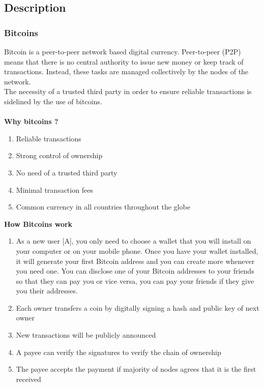 \documentclass[a4page,12pt]{article}
\begin{document}
\subsection{Description}
\subsubsection{Bitcoins}
Bitcoin is a peer-to-peer network based digital currency. Peer-to-peer (P2P) means that there is no central authority to issue new money or keep track of transactions. Instead, these tasks are managed collectively by the nodes of the network.\\The necessity of a trusted third party in order to ensure reliable transactions is sidelined by the use of bitcoins.\\\\
\textbf{Why bitcoins ?}
\begin{enumerate}
\item Reliable transactions
\item Strong control of ownership
\item No need of a trusted third party
\item Minimal transaction fees
\item Common currency in all countries throughout the globe
\end{enumerate}
\textbf{How Bitcoins work}
\begin{enumerate}
\item As a new user [A], you only need to choose a wallet that you will install on your computer or on your mobile phone. Once you have your wallet installed, it will generate your first Bitcoin address and you can create more whenever you need one. You can disclose one of your Bitcoin addresses to your friends so that they can pay you or vice versa, you can pay your friends if they give you their addresses.
\item Each owner transfers a coin by digitally signing a hash and public key of next owner
\item New transactions will be publicly announced 
\item A payee can verify the signatures to verify the chain of ownership
\item The payee accepts the payment if majority of nodes agrees that it is the first received
\end{enumerate}
\end{document}
